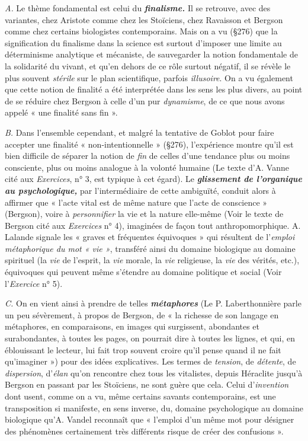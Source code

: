 {\it A.} Le thème fondamental est celui du \textbf{\textit {finalisme.}} Il se retrouve,
avec des variantes, chez Aristote comme chez les Stoïciens, chez
Ravaisson et Bergson comme chez certains biologistes contemporains.
Mais on a vu (\S276) que la signification du finalisme dans la science est
surtout d'imposer une limite au déterminisme analytique et mécaniste,
de sauvegarder la notion fondamentale de la solidarité du vivant, et
qu’en dehors de ce rôle surtout négatif, il se révèle le plus souvent
{\it stérile} sur le plan scientifique, parfois {\it illusoire}. On a vu également que
cette notion de finalité a été interprétée dans les sens les plus divers, au
point de se réduire chez Bergson à celle d’un pur {\it dynamisme}, de ce
que nous avons appelé « une finalité sans fin ».

{\it B.} Dans l’ensemble cependant, et malgré la tentative de Goblot
pour faire accepter une finalité « non-intentionnelle » (\S 276), l’expérience
montre qu'il est bien difficile de séparer la notion de {\it fin} de
celles d’une tendance plus ou moins consciente, plus ou moins analogue
à la volonté humaine
{\scriptsize (Le texte d'A. Vanne cité aux {\it Exercices}, n° 3, est typique à cet égard)}. Le \textbf{\textit {glissement de l'organique au psychologique,}}
par l'intermédiaire de cette ambiguïté, conduit alors à affirmer que
« l’acte vital est de même nature que l'acte de conscience » (Bergson),
voire à {\it personnifier} la vie et la nature elle-même
{\scriptsize (Voir le texte de Bergson cité aux {\it Exercices} n° 4)}, imaginées de façon
tout anthropomorphique. A. Lalande signale les « graves et fréquentes
équivoques » qui résultent de l’{\it emploi métaphorique du mot
« vie »}, transféré ainsi du domaine biologique au domaine spirituel
(la {\it vie} de l'esprit, la {\it vie} morale, la {\it vie} religieuse, la {\it vie} des vérités,
etc.), équivoques qui peuvent même s'étendre au domaine politique
et social
{\scriptsize (Voir l'{\it Exercice} n° 5)}.

{\it C.} On en vient ainsi à prendre de telles \textbf{\textit {métaphores}}
{\scriptsize (Le P. Laberthonnière parle un peu sévèrement, à propos de Bergson, de « la
richesse de son langage en métaphores, en comparaisons, en images qui surgissent,
abondantes et surabondantes, à toutes les pages, on pourrait dire à toutes les lignes,
et qui, en éblouissant le lecteur, lui fait trop souvent croire qu'il pense quand il ne fait
qu'imaginer »)} pour des
idées explicatives. Les termes de {\it tension}, de {\it détente}, de {\it dispersion},
d’{\it élan} qu’on rencontre chez tous les vitalistes, depuis Héraclite
jusqu’à Bergson en passant par les Stoïciens, ne sont guère que cela.
Celui d'{\it invention} dont usent, comme on a vu, même certains savants
contemporains, est une transposition si manifeste, en sens inverse,
du, domaine psychologique au domaine biologique qu’A. Vandel
reconnaît que « l'emploi d’un même mot pour désigner des phénomènes
certainement très différents risque de créer des confusions ».

